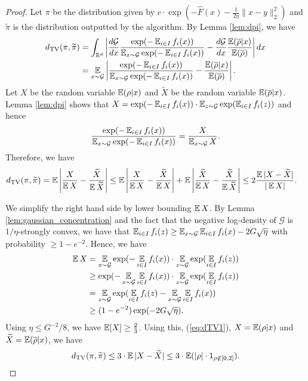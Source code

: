\begin{proof}
Let $\pi$ be the distribution given by $c\cdot\exp(-\widehat{F}(x)-\frac{1}{2\eta}\|x-y\|_{2}^{2})$
and $\widetilde{\pi}$ is the distribution outputted by the algorithm.
By Lemma \ref{lem:dpi}, we have
\begin{align*}
d_{\mathrm{TV}}(\pi,\widetilde{\pi}) & =\int_{\R^{d}}\left|\frac{d\mathcal{G}}{dx}\frac{\exp(-\E_{i\in I}f_{i}(x))}{\E_{x\sim\mathcal{G}}\exp(-\E_{i\in I}f_{i}(x))}-\frac{d\mathcal{G}}{dx}\frac{\E(\overline{\rho}|x)}{\E(\overline{\rho})}\right|dx\\
 & =\E_{x\sim\mathcal{G}}\left|\frac{\exp(-\E_{i\in I}f_{i}(x))}{\E_{x\sim\mathcal{G}}\exp(-\E_{i\in I}f_{i}(x))}-\frac{\E(\overline{\rho}|x)}{\E(\overline{\rho})}\right|.
\end{align*}
Let $X$ be the random variable $\E(\rho|x)$ and $\widetilde{X}$
be the random variable $\E(\overline{\rho}|x)$. Lemma \ref{lem:dpi}
shows that $X=\exp(-\E_{i\in I}f_{i}(x))\cdot\E_{z\sim\mathcal{G}}\exp(\E_{i\in I}f_{i}(z))$
and hence
\[
\frac{\exp(-\E_{i\in I}f_{i}(x))}{\E_{x\sim\mathcal{G}}\exp(-\E_{i\in I}f_{i}(x))}=\frac{X}{\E_{x\sim \G}X}.
\]
Therefore, we have
\begin{align}
d_{\mathrm{TV}}(\pi,\widetilde{\pi}) & =\E\left|\frac{X}{\E X}-\frac{\widetilde{X}}{\E\widetilde{X}}\right|\leq\E\left|\frac{X}{\E X}-\frac{\widetilde{X}}{\E X}\right|+\E\left|\frac{\widetilde{X}}{\E X}-\frac{\widetilde{X}}{\E\widetilde{X}}\right|\leq2\frac{\E|X-\widetilde{X}|}{|\E X|}.\label{eq:dTV1}
\end{align}

We simplify the right hand side by lower bounding $\E X$. By Lemma
\ref{lem:gaussian_concentration} and the fact that the negative log-density of $\mathcal{G}$ is $1/\eta$-strongly convex, we have that $\E_{i\in I}f_{i}(z)\geq\E_{x\sim\mathcal{G}}\E_{i\in I}f_{i}(x)-2G \sqrt{\eta}$
with probability $\geq1-e^{-2}$. Hence, we have
\begin{align*}
\E X & =\E_{x\sim\mathcal{G}}\exp(-\E_{i\in I}f_{i}(x))\cdot\E_{z\sim\mathcal{G}}\exp(\E_{i\in I}f_{i}(z))\\
 & \geq\exp(-\E_{x\sim\mathcal{G}}\E_{i\in I}f_{i}(x))\cdot\E_{z\sim\mathcal{G}}\exp(\E_{i\in I}f_{i}(z))\\
 & =\E_{z\sim\mathcal{G}}\exp(\E_{i\in I}f_{i}(z)-\E_{x\sim\mathcal{G}}\E_{i\in I}f_{i}(x))\\
 & \geq(1-e^{-2})\exp(-2G \sqrt{\eta}).
\end{align*}
Using $\eta\leq G^{-2}/8$,
we have $\E [X]\geq\frac{2}{3}$. Using this, (\ref{eq:dTV1}), $X=\E(\rho|x)$
and $\widetilde{X}=\E(\overline{\rho}|x)$, we have
\[
d_{\mathrm{TV}}(\pi,\widetilde{\pi})\leq 3 \cdot\E|X-\widetilde{X}|\leq 3\cdot\E(|\rho|\cdot1_{\rho \notin [0,2]}).
\]


\end{proof}
